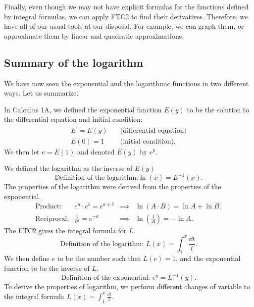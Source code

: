 Finally, even though we may not have explicit formulas for the functions defined by integral formulas, we can apply FTC2 to find their derivatives. Therefore, we have all of our usual tools at our disposal. For example, we can graph them, or approximate them by linear and quadratic approximations.
\subsection{Summary of the logarithm}
We have now seen the exponential and the logarithmic functions in two different ways. Let us summarize.

In Calculus 1A, we defined the exponential function $E(y)$ to be the solution to the differential equation and initial condition:
\begin{align*}
  E^\prime=E(y)\quad & \text{(differential equation)}\\
  E(0)=1\quad & \text{(initial condition).}
\end{align*}
We then let $e=E(1)$ and denoted $E(y)$ by $e^y$.

We defined the logarithm as the inverse of $E(y)$
\[\text{Definition of the logarithm:}\ln(x)=E^{-1}(x).\]
The properties of the logarithm were derived from the properties of the exponential.
\[\begin{array}{llcl}
  \text{Product:} & e^a\cdot e^b=e^{a+b} & \implies & \ln(A\cdot B)=\ln A+\ln B,\\
  \text{Reciprocal:} & \frac1{e^a}=e^{-a} & \implies & \ln(\frac1{A})=-\ln A.
\end{array}\]
The FTC2 gives the integral formula for $L$.
\[\text{Definition of the logarithm: }L(x)=\int_1^x\frac{\dd t}t.\]
We then define $e$ to be the number such that $L(e)=1$, and the exponential function to be the inverse of $L$.
\[\text{Definition of the exponential: }e^y=L^{-1}(y).\]
To derive the properties of logarithm, we perform different changes of variable to the integral formula $L(x)=\int_1^x\frac{\dd t}t$.
